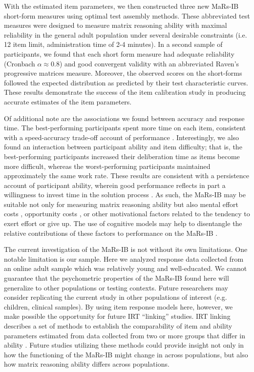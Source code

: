 \documentclass[a4paper,man,natbib]{apa6}
\begin{document}
With the estimated item parameters, we then constructed three new MaRs-IB short-form measures using optimal test assembly methods. These abbreviated test measures were designed to measure matrix reasoning ability with maximal reliability in the general adult population under several desirable constraints (i.e. 12 item limit, administration time of 2-4 minutes). In a second sample of participants, we found that each short form measure had adequate reliability (Cronbach $\alpha \approx 0.8$) and good convergent validity with an abbreviated Raven's progressive matrices measure. Moreover, the observed scores on the short-forms followed the expected distribution as predicted by their test characteristic curves. These results demonstrate the success of the item calibration study in producing accurate estimates of the item parameters. 

Of additional note are the associations we found between accuracy and response time. The best-performing participants spent more time on each item, consistent with a speed-accuracy trade-off account of performance \citep{heitz2014speed}. Interestingly, we also found an interaction between participant ability and item difficulty; that is, the best-performing participants increased their deliberation time as items become more difficult, whereas the worst-performing participants maintained approximately the same work rate. These results are consistent with a persistence account of participant ability, wherein good performance reflects in part a willingness to invest time in the solution process \citep{ranger2021effects}. As such, the MaRs-IB may be suitable not only for measuring matrix reasoning ability but also mental effort costs \citep{kool2018mental}, opportunity costs \citep{otto2019opportunity}, or other motivational factors \citep{duckworth2011role} related to the tendency to exert effort or give up. The use of cognitive models may help to disentangle the relative contributions of these factors to performance on the MaRs-IB \citep{ranger2014accumulator}.

The current investigation of the MaRs-IB is not without its own limitations. One notable limitation is our sample. Here we analyzed response data collected from an online adult sample which was relatively young and well-educated. We cannot guarantee that the psychometric properties of the MaRs-IB found here will generalize to other populations or testing contexts. Future researchers may consider replicating the current study in other populations of interest (e.g. children, clinical samples). By using item response models here, however, we make possible the opportunity for future IRT ``linking'' studies. IRT linking describes a set of methods to establish the comparability of item and ability parameters estimated from data collected from two or more groups that differ in ability \citep{lee2018irt}. Future studies utilizing these methods could provide insight not only in how the functioning of the MaRs-IB might change in across populations, but also how matrix reasoning ability differs across populations.
\end{document}
